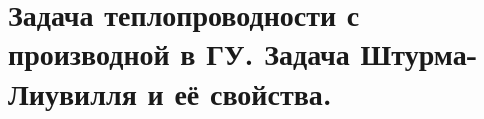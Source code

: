 \chapter{Задача теплопроводности с производной в ГУ. Задача Штурма-Лиувилля и её
свойства.}

\newpage
